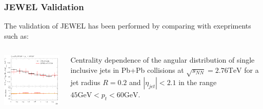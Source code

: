 \documentclass{beamer}
\begin{document}
\begin{frame}\frametitle{JEWEL Validation}
    \begin{minipage}{1\textwidth}
	The validation of JEWEL has been performed by comparing with exepriments such as:    
    \end{minipage}
    \begin{columns}
    \begin{column}{0.5\textwidth}
	\begin{minipage}[l]{0.5\textwidth}
	\includegraphics[scale=0.5]{images/atlas_jewel.png}
	\end{minipage}
	\end{column}
    \begin{column}{0.5\textwidth}
	\begin{minipage}[r]{1\textwidth}
	Centrality dependence of the angular distribution of single inclusive jets in Pb+Pb collisions
	at $\sqrt{s_{NN}}=2.76\mathrm{TeV}$ for a jet radius $R=0.2$ and $|\eta_{jet}|<2.1$ in the
	range $45\mathrm{GeV}<p_t<60\mathrm{GeV}$.
	\end{minipage}
	\end{column}
	\end{columns}
\end{frame}
\end{document}

